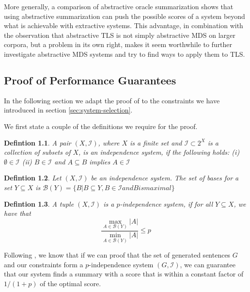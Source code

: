 \documentclass[a4paper,BCOR=10mm]{report}
\numberwithin{lemma}{chapter}
\newtheorem{definition}{Defintion}
\numberwithin{definition}{chapter}
\begin{document}
More generally, a comparison of abstractive oracle summarization shows that using abstractive summarization can push the possible scores of a system beyond what is achievable with extractive systems. This advantage, in combination with the observation that abstractive TLS is not simply abstractive MDS on larger corpora, but a problem in its own right, makes it seem worthwhile to further investigate abstractive MDS systems and try to find ways to apply them to TLS.


 


\begin{appendices}
\chapter{Proof of Performance Guarantees}

In the following section we adapt the proof of \citet{markert} to the constraints we have introduced in section \ref{sec:system-selection}.

We first state a couple of the definitions we require for the proof.

\begin{definition}
A pair $(X, \mathcal{I})$, where $X$ is a finite set and $\mathcal{I} \subset 2^X$ is a collection of subsets of $X$, is an independence system, if the following holds: (i) $\emptyset \in \mathcal{I}$ (ii) $B \in \mathcal{I}$ and $A \subseteq B$ implies $A \in \mathcal{I}$
\end{definition}

\begin{definition}
Let $(X, \mathcal{I})$ be an independence system. The set of bases for a set $Y \subseteq X$ is $\mathcal{B}(Y) = \{B | B \subseteq Y, B \in \mathcal{I} \mathit{ and } B \mathit{ is maximal} \}$
\end{definition}


\begin{definition}
A tuple $(X, \mathcal{I})$ is a $p$-independence system, if for all $Y \subseteq X$, we have that
\begin{equation}
 \frac{\max_{A \in \mathcal{B}(Y)} |A|}{\min_{A \in \mathcal{B}(Y)} |A|} \leq p
\end{equation}
\end{definition}

Following \citet{markert}, we know that if we can proof that the set of generated sentences $G$ and our constraints form a $p$-independence system $(G, \mathcal{I})$, we can guarantee that our system finds a summary with a score that is within a constant factor of $1 / (1 + p)$ of the optimal score.


\end{appendices}
\end{document}
